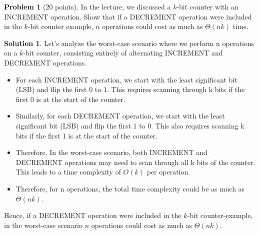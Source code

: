 \documentclass{article}
\theoremstyle{definition}
\newtheorem{problem}{Problem}
\newtheorem*{solution}{Solution}
\begin{document}
\begin{problem}[20 points]
  In the lecture, we discussed a $k$-bit counter with an INCREMENT
  operation.  Show that if a DECREMENT operation were included in the $k$-bit
  counter example, $n$ operations could cost as much as $\Theta(nk)$
  time.
\end{problem}
\begin{solution}
Let's analyze the worst-case scenario where we perform n operations on a $k$-bit counter, consisting entirely of alternating INCREMENT and DECREMENT operations.
\begin{itemize}
    \item For each INCREMENT operation, we start with the least significant bit (LSB) and flip the first 0 to 1. This requires scanning through k bits if the first 0 is at the start of the counter.
    \item Similarly, for each DECREMENT operation, we start with the least significant bit (LSB) and flip the first 1 to 0. This also requires scanning k bits if the first 1 is at the start of the counter.
    \item Therefore, In the worst-case scenario, both INCREMENT and DECREMENT operations may need to scan through all k bits of the counter. This leads to a time complexity of $O(k)$ per operation.
    \item Therefore, for n operations, the total time complexity could be as much as $\Theta(nk)$.
\end{itemize}
Hence, if a DECREMENT operation were included in the $k$-bit counter-example, in the worst-case scenario $n$ operations could cost as much as $\Theta(nk)$.
\end{solution}
\newpage
\end{document}
